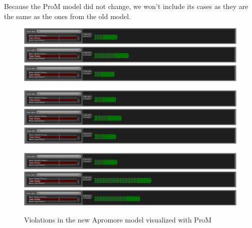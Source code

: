 Because the ProM model did not change, we won't include its cases as
they are the same as the ones from the old model.

\begin{figure}[H]
\centering
\includegraphics[width=\textwidth]{figures/violation_case/10-apromore-new.png}
\includegraphics[width=\textwidth]{figures/violation_case/20-apromore-new.png}
\includegraphics[width=\textwidth]{figures/violation_case/47-apromore-new.png}

\includegraphics[width=\textwidth]{figures/violation_case/53-apromore-new.png}
\includegraphics[width=\textwidth]{figures/violation_case/63-apromore-new.png}
\includegraphics[width=\textwidth]{figures/violation_case/88-apromore-new.png}

\includegraphics[width=\textwidth]{figures/violation_case/6-apromore-new.png}
\includegraphics[width=\textwidth]{figures/violation_case/72-apromore-new.png}
\includegraphics[width=\textwidth]{figures/violation_case/81-apromore-new.png}
\caption{Violations in the new Apromore model visualized with ProM}
\label{fig:violations_apromore_new}
\end{figure}
